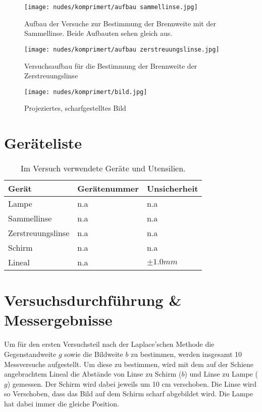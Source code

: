 \documentclass[12pt,a4paper,twoside]{article}
\begin{document}
    \begin{figure}[H]
        \centering
        \texttt{[image: nudes/komprimert/aufbau sammellinse.jpg]}
        \caption{Aufbau der Versuche zur Bestimmung der Brennweite mit der Sammellinse. Beide Aufbauten sehen gleich aus. }
        \label{fig:aufbau Sammellinse}
    \end{figure}

    \begin{figure}[H]
        \centering
        \texttt{[image: nudes/komprimert/aufbau zerstreuungslinse.jpg]}
        \caption{Versuchsaufbau für die Bestimmung der Brennweite der Zerstreuungslinse}
        \label{fig:aufbau Zerstreuungslinse}
    \end{figure}

    \begin{figure}[H]
        \centering
        \texttt{[image: nudes/komprimert/bild.jpg]}
        \caption{Projeziertes, scharfgestelltes Bild}
        \label{fig:aufbau Bild}
    \end{figure}

\section{Geräteliste} %

    \begin{table}[H]
        \centering
        \caption{Im Versuch verwendete Geräte und Utensilien.}
        \label{tab:geraete}
        \begin{tabular}{| l | l | l |}
            \hline
            Gerät  & Gerätenummer  & Unsicherheit \\
            \hline
            Lampe & {n.a} & {n.a} \\
            Sammellinse & {n.a} & {n.a} \\
            Zerstreuungslinse & {n.a} & {n.a} \\
            Schirm & {n.a} & {n.a} \\
            Lineal & {n.a} & $\pm 1.0 mm$ \\
        \end{tabular}
    \end{table}


\section{Versuchsdurchführung \& Messergebnisse} %
Um für den ersten Versuchsteil nach der Laplace'schen Methode die Gegenstandweite $g$ sowie die Bildweite $b$ zu bestimmen, werden insgesamt 10 Messversuche aufgestellt. 
Um diese zu bestimmen, wird mit dem auf der Schiene angebrachtem Lineal die Abstände von Linse zu Schirm ($b$) und Linse zu Lampe ($g$) gemessen. 
Der Schirm wird dabei jeweils um 10 cm verschoben. Die Linse wird so Verschoben, dass das Bild auf dem Schirm scharf abgebildet wird. Die Lampe hat dabei immer die gleiche Position. 
\end{document}
